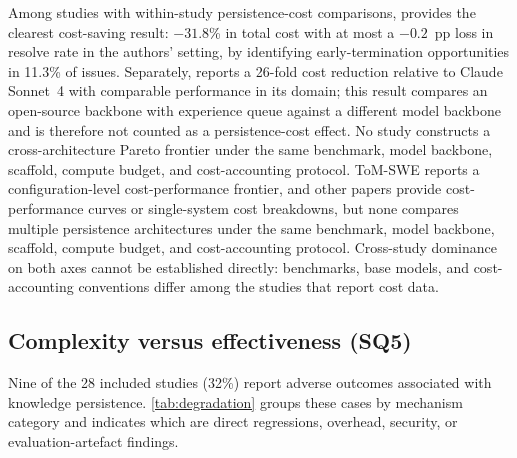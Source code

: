 Among studies with within-study persistence-cost comparisons,
\citet{guo2026eet} provides the clearest cost-saving result:
$-31.8$\% in total cost with at most a $-0.2$~pp loss in resolve rate
in the authors' setting, by identifying early-termination opportunities
in 11.3\% of issues.
Separately, \citet{zhang2025accelopt} reports a 26-fold cost reduction
relative to Claude Sonnet~4 with comparable performance in its
domain;
this result compares an open-source backbone with experience queue
against a different model backbone and is therefore not counted as a
persistence-cost effect.
No study constructs a cross-architecture Pareto frontier under the same
benchmark, model backbone, scaffold, compute budget, and
cost-accounting protocol.
ToM-SWE reports a configuration-level cost-performance frontier, and
other papers provide cost-performance curves or single-system cost
breakdowns, but none compares multiple persistence architectures under
the same benchmark, model backbone, scaffold, compute budget, and
cost-accounting protocol.
Cross-study dominance on both axes cannot be established directly:
benchmarks, base models, and cost-accounting conventions differ among
the studies that report cost data.

\FloatBarrier
\subsection{Complexity versus effectiveness (SQ5)}
\label{sec:sq5}

Nine of the 28 included studies (32\%) report adverse outcomes
associated with knowledge persistence.
\autoref{tab:degradation} groups these cases by mechanism category and
indicates which are direct regressions, overhead, security, or
evaluation-artefact findings.

